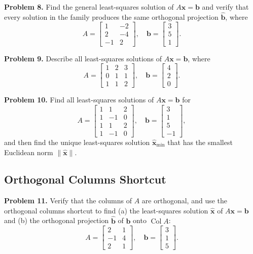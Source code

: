 \documentclass[11pt, letterpaper]{article}
\theoremstyle{definition}
\theoremstyle{remark}
\begin{document}
\textbf{Problem 8.} Find the general least-squares solution of $A\mathbf{x} = \mathbf{b}$ and verify that every solution in the family produces the same orthogonal projection $\hat{\mathbf{b}}$, where
\[
A = \begin{bmatrix} 1 & -2 \\ 2 & -4 \\ -1 & 2 \end{bmatrix}, \quad \mathbf{b} = \begin{bmatrix} 3 \\ 5 \\ 1 \end{bmatrix}.
\]

\textbf{Problem 9.} Describe all least-squares solutions of $A\mathbf{x} = \mathbf{b}$, where
\[
A = \begin{bmatrix} 1 & 2 & 3 \\ 0 & 1 & 1 \\ 1 & 1 & 2 \end{bmatrix}, \quad \mathbf{b} = \begin{bmatrix} 4 \\ 2 \\ 0 \end{bmatrix}.
\]

\textbf{Problem 10.} Find all least-squares solutions of $A\mathbf{x} = \mathbf{b}$ for
\[
A = \begin{bmatrix} 1 & 1 & 2 \\ 1 & -1 & 0 \\ 1 & 1 & 2 \\ 1 & -1 & 0 \end{bmatrix}, \quad \mathbf{b} = \begin{bmatrix} 3 \\ 1 \\ 5 \\ -1 \end{bmatrix},
\]
and then find the unique least-squares solution $\hat{\mathbf{x}}_{\min}$ that has the smallest Euclidean norm $\|\hat{\mathbf{x}}\|$.

\subsection{Orthogonal Columns Shortcut}

\textbf{Problem 11.} Verify that the columns of $A$ are orthogonal, and use the orthogonal columns shortcut to find (a) the least-squares solution $\hat{\mathbf{x}}$ of $A\mathbf{x} = \mathbf{b}$ and (b) the orthogonal projection $\hat{\mathbf{b}}$ of $\mathbf{b}$ onto $\operatorname{Col} A$:
\[
A = \begin{bmatrix} 2 & 1 \\ -1 & 4 \\ 2 & 1 \end{bmatrix}, \quad \mathbf{b} = \begin{bmatrix} 3 \\ 1 \\ 5 \end{bmatrix}.
\]
\end{document}
